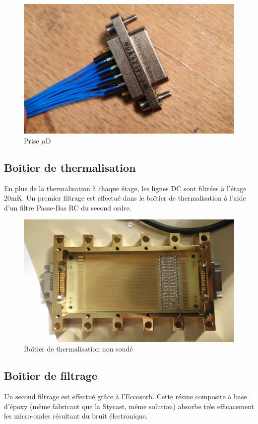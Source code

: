 \begin{figure}[h]
    \begin{center}
        \includegraphics[height=0.4\textwidth]{Images/uD}
        \caption{Prise $\mu$D}
        \label{prise_uD}
    \end{center}
\end{figure}


\subsection{Boîtier de thermalisation}
En plus de la thermalisation à chaque étage, les lignes DC sont filtrées à l'étage 20mK. Un premier filtrage est effectué dans le boîtier de thermalisation à l'aide d'un filtre Passe-Bas RC du second ordre.

\begin{figure}[h]
    \begin{center}
        \includegraphics[height=0.4\textwidth]{Images/Thermalisation/DC3}
        \caption{Boîtier de thermalisation non soudé}
        \label{DC_Filtrage}
    \end{center}
\end{figure}

\subsection{Boîtier de filtrage}
Un second filtrage est effectué grâce à l'Eccosorb. Cette résine composite à base d'époxy (même fabricant que la Stycast, même solution) absorbe très efficacement les micro-ondes résultant du bruit électronique.

